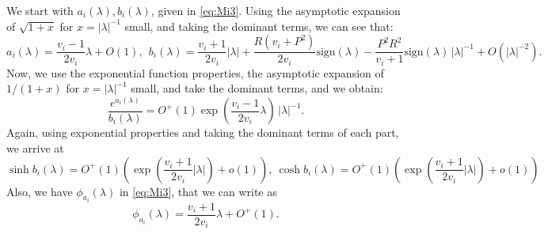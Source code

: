 \documentclass[a4paper]{article}
\numberwithin{equation}{section}
\begin{document}
We start with $a_i(\lambda),b_i(\lambda)$, given in \eqref{eq:Mi3}. Using the asymptotic expansion of $\sqrt{1+x}$ for $x=|\lambda|^{-1}$ small, and taking the dominant terms, we can see that:
$$a_i(\lambda)=\dfrac{v_i-1}{2v_i}\lambda+O(1),\ \ b_i(\lambda)=\dfrac{v_i+1}{2v_i}|\lambda|+\dfrac{R(v_i+P^2)}{2v_i}\textrm{sign}(\lambda) -\dfrac{P^2R^2}{v_i+1}\textrm{sign}(\lambda)\,|\lambda|^{-1}+O\left(|\lambda|^{-2}\right).$$
Now, we use the exponential function properties, the asymptotic expansion of $1/(1+x)$ for $x=|\lambda|^{-1}$ small, and take the dominant terms, and we obtain:
$$\dfrac{e^{a_i(\lambda)}}{b_i(\lambda)}=O^+(1)\exp\left(\dfrac{v_i-1}{2v_i}\lambda\right)\,|\lambda|^{-1}.$$
Again, using exponential properties and taking the dominant terms of each part, we arrive at
$$
\sinh b_i(\lambda)=O^+(1)\left( \exp\left( \dfrac{v_i+1}{2v_i}|\lambda| \right) +o(1)  \right)
, \ \cosh b_i(\lambda) = O^+(1)\left( \exp\left( \dfrac{v_i+1}{2v_i}|\lambda| \right) +o(1)  \right)$$
Also, we have $\phi_{a_i}(\lambda)$ in \eqref{eq:Mi3}, that we can write as
$$\phi_{a_i}(\lambda)=\dfrac{v_i+1}{2v_i}\lambda+O^+(1).$$
\end{document}
